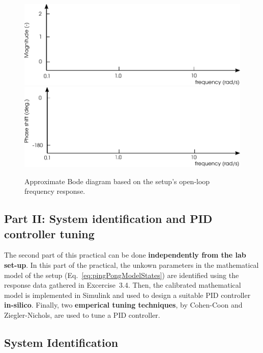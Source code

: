 \documentclass[10pt,twoside,openright]{article}
\begin{document}
		\begin{figure}[t!]
			\centering
			\includegraphics[width=0.75\linewidth]{bode_diagram_empty_1.pdf}
			\includegraphics[width=0.75\linewidth]{bode_diagram_empty_2.pdf}
			\caption{Approximate Bode diagram based on the setup's open-loop frequency response.}
 		\end{figure}

\subsection*{Part II: System identification and PID controller tuning}

The second part of this practical can be done \textbf{independently from the lab set-up}. In this part of the practical, the unkown parameters in the mathematical model of the setup (Eq.~\ref{eq:pingPongModelStates}) are identified using the response data gathered in Excercise~3.4. Then, the calibrated mathematical model is implemented in Simulink and used to design a suitable PID controller \textbf{in-silico}. Finally, two \textbf{emperical tuning techniques}, by Cohen-Coon and Ziegler-Nichols, are used to tune a PID controller. 

\subsection{System Identification}
\end{document}
